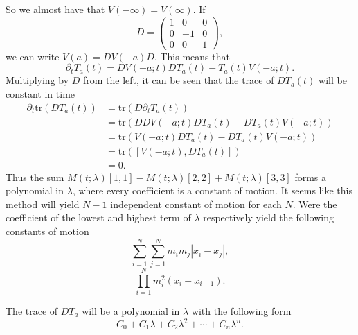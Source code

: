 \documentclass[english,master]{liumaiex}
\theoremstyle{plain}
\theoremstyle{definition}
\newcommand{\tr}{\text{tr}}
\begin{document}
So we almost have that $V(-\infty) = V(\infty)$. If
\begin{equation}
	D = 
\begin{pmatrix}
	1 & 0 & 0 \\
	0 & -1 & 0 \\
	0 & 0 & 1
\end{pmatrix},
\end{equation}
%
we can write $V(a) = DV(-a)D$. This means that 
\begin{equation}
	\partial_t T_a(t) = DV(-a;t)DT_a(t) - T_a(t)V(-a;t).
\end{equation}
Multiplying by $D$ from the left, it can be seen that the trace of $DT_a(t)$ will be constant in time
\begin{equation}
\begin{aligned}
	\partial_t \tr(D T_a(t))
	&= \tr(D \partial_t T_a(t)) \\
	&= \tr(DDV(-a;t)DT_a(t) - DT_a(t)V(-a;t)) \\
	&= \tr(V(-a;t)DT_a(t) - DT_a(t)V(-a;t)) \\
	&= \tr([V(-a;t), DT_a(t)]) \\
	&= 0.
\end{aligned}
\end{equation}
Thus the sum $M(t;\lambda)[1,1] - M(t;\lambda)[2,2] + M(t;\lambda)[3,3]$ forms a polynomial in $\lambda$, where every coefficient is a constant of motion. It seems like this method will yield $N-1$ independent constant of motion for each $N$. Were the coefficient of the lowest and highest term of $\lambda$ respectively yield the following constants of motion
\begin{equation}
	\sum_{i=1}^{N}\sum_{j=1}^N m_i m_j |x_i - x_j|,
\end{equation}
\begin{equation}
	\prod_{i=1}^{N} m_i^2 (x_i - x_{i-1}).
\end{equation}

The trace of $DT_a$ will be a polynomial in $\lambda$ with the following form
\begin{equation}
	C_0 + C_1 \lambda + C_2 \lambda^2 + \cdots + C_{n} \lambda^{n}.
\end{equation}
\end{document}
